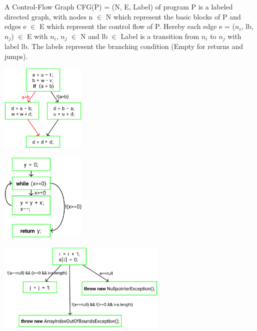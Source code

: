 \documentclass[
../../Software_Engineering_Summary.tex,
]
{subfiles}
\begin{document}
\begin{defbox}
    A Control-Flow Graph CFG(P) = (N, E, Label) of program P is a labeled directed graph, with nodes n $\in$ N which represent the basic blocks of P and edges e $\in$ E which represent the control flow of P. 
    Hereby each edge e = ($n_i$, lb, $n_j$) $\in$ E with $n_i$, $n_j$ $\in$ N and lb $\in$ Label is a transition from $n_i$ to $n_j$ with label lb.
    The labels represent the branching condition (Empty for returns and jumps).

    \begin{minipage}
        [t]{0.25\textwidth}
        \includegraphics[height=120pt]{Pics/06/ExampleCFG.png}
    \end{minipage}
    \hfill
    \begin{minipage}
        [t]{0.25\textwidth}
        \includegraphics[height=120pt]{Pics/06/ExampleCFGLoop.png}
    \end{minipage}
    \hfill
    \begin{minipage}
        [t]{0.48\textwidth}
        \includegraphics[height=120pt]{Pics/06/ExampleCFGExceptions.png}
    \end{minipage}
\end{defbox}
\end{document}
